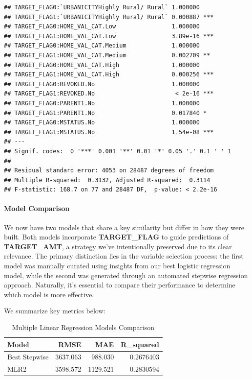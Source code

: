 \documentclass[
]{article}
\begin{document}
\begin{verbatim}
## TARGET_FLAG0:`URBANICITYHighly Rural/ Rural` 1.000000    
## TARGET_FLAG1:`URBANICITYHighly Rural/ Rural` 0.000887 ***
## TARGET_FLAG0:HOME_VAL_CAT.Low                1.000000    
## TARGET_FLAG1:HOME_VAL_CAT.Low                3.89e-16 ***
## TARGET_FLAG0:HOME_VAL_CAT.Medium             1.000000    
## TARGET_FLAG1:HOME_VAL_CAT.Medium             0.002709 ** 
## TARGET_FLAG0:HOME_VAL_CAT.High               1.000000    
## TARGET_FLAG1:HOME_VAL_CAT.High               0.000256 ***
## TARGET_FLAG0:REVOKED.No                      1.000000    
## TARGET_FLAG1:REVOKED.No                       < 2e-16 ***
## TARGET_FLAG0:PARENT1.No                      1.000000    
## TARGET_FLAG1:PARENT1.No                      0.017840 *  
## TARGET_FLAG0:MSTATUS.No                      1.000000    
## TARGET_FLAG1:MSTATUS.No                      1.54e-08 ***
## ---
## Signif. codes:  0 '***' 0.001 '**' 0.01 '*' 0.05 '.' 0.1 ' ' 1
## 
## Residual standard error: 4053 on 28487 degrees of freedom
## Multiple R-squared:  0.3132, Adjusted R-squared:  0.3114 
## F-statistic: 168.7 on 77 and 28487 DF,  p-value: < 2.2e-16
\end{verbatim}

\paragraph{Model Comparison}\label{model-comparison-1}

We now have two models that share a key similarity but differ in how
they were built. Both models incorporate \textbf{TARGET\_FLAG} to guide
predictions of \textbf{TARGET\_AMT}, a strategy we've intentionally
preserved due to its clear relevance. The primary distinction lies in
the variable selection process: the first model was manually curated
using insights from our best logistic regression model, while the second
was generated through an automated stepwise regression approach.
Naturally, it's essential to compare their performance to determine
which model is more effective.

We summarize key metrics below:

\begin{table}[H]
\centering\centering
\caption{\label{tab:unnamed-chunk-14}Multiple Linear Regression Models Comparison}
\centering
\begin{tabular}[t]{l|r|r|r}
\hline
Model & RMSE & MAE & R\_squared\\
\hline
Best Stepwise & 3637.063 & 988.030 & 0.2676403\\
\hline
MLR2 & 3598.572 & 1129.521 & 0.2830594\\
\hline
\end{tabular}
\end{table}
\end{document}
